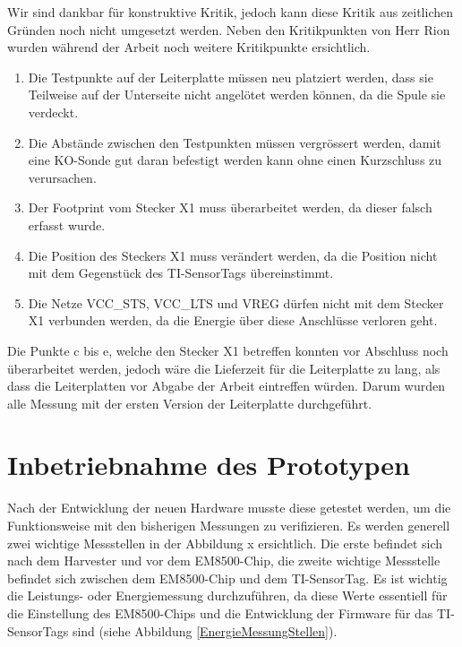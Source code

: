 Wir sind dankbar für konstruktive Kritik, jedoch kann diese Kritik aus zeitlichen Gründen noch nicht umgesetzt werden. Neben den Kritikpunkten von Herr Rion wurden während der Arbeit noch weitere Kritikpunkte ersichtlich.

\begin{enumerate}
    \item Die Testpunkte auf der Leiterplatte müssen neu platziert werden, dass sie Teilweise auf der Unterseite nicht angelötet werden können, da die Spule sie verdeckt. 
    \item Die Abstände zwischen den Testpunkten müssen vergrössert werden, damit eine KO-Sonde gut daran befestigt werden kann ohne einen Kurzschluss zu verursachen.
    \item Der Footprint vom Stecker X1 muss überarbeitet werden, da dieser falsch erfasst wurde.
	\item Die Position des Steckers X1 muss verändert werden, da die Position nicht mit dem Gegenstück des TI-SensorTags übereinstimmt.
	\item Die Netze VCC_STS, VCC_LTS und VREG dürfen nicht mit dem Stecker X1 verbunden werden, da die Energie über diese Anschlüsse verloren geht.
\end{enumerate}

Die Punkte c bis e, welche den Stecker X1 betreffen konnten vor Abschluss noch überarbeitet werden, jedoch wäre die Lieferzeit für die Leiterplatte zu lang, als dass die Leiterplatten vor Abgabe der Arbeit eintreffen würden. Darum wurden alle Messung mit der ersten Version der Leiterplatte durchgeführt.


\section{Inbetriebnahme des Prototypen}
Nach der Entwicklung der neuen Hardware musste diese getestet werden, um die Funktionsweise mit den bisherigen Messungen zu verifizieren. Es werden generell zwei wichtige Messstellen in der Abbildung x ersichtlich. Die erste befindet sich nach dem Harvester und vor dem EM8500-Chip, die zweite wichtige Messstelle befindet sich zwischen dem EM8500-Chip und dem TI-SensorTag. Es ist wichtig die Leistungs- oder Energiemessung durchzuführen, da diese Werte essentiell für die Einstellung des EM8500-Chips und die Entwicklung der Firmware für das TI-SensorTags sind (siehe Abbildung \ref{EnergieMessungStellen}). 

